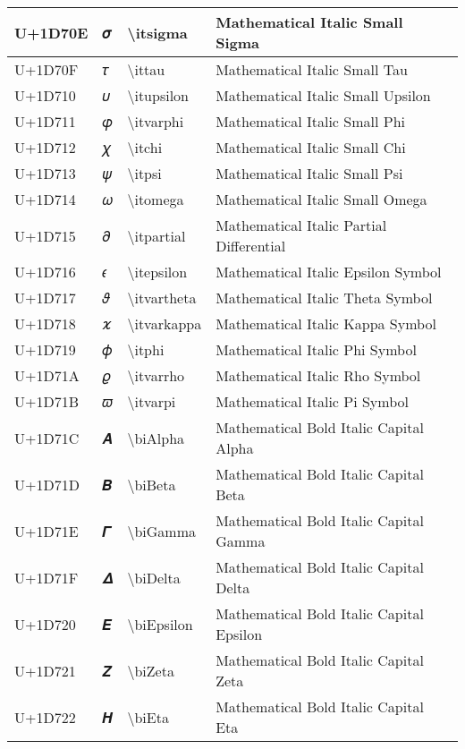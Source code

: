\begin{table}[h]
\begin{tabulary}{\linewidth}{|L|L|L|L|}
\hline
U+1D70E & 𝜎 & {\textbackslash}itsigma & Mathematical Italic Small Sigma \\
\hline
U+1D70F & 𝜏 & {\textbackslash}ittau & Mathematical Italic Small Tau \\
\hline
U+1D710 & 𝜐 & {\textbackslash}itupsilon & Mathematical Italic Small Upsilon \\
\hline
U+1D711 & 𝜑 & {\textbackslash}itvarphi & Mathematical Italic Small Phi \\
\hline
U+1D712 & 𝜒 & {\textbackslash}itchi & Mathematical Italic Small Chi \\
\hline
U+1D713 & 𝜓 & {\textbackslash}itpsi & Mathematical Italic Small Psi \\
\hline
U+1D714 & 𝜔 & {\textbackslash}itomega & Mathematical Italic Small Omega \\
\hline
U+1D715 & 𝜕 & {\textbackslash}itpartial & Mathematical Italic Partial Differential \\
\hline
U+1D716 & 𝜖 & {\textbackslash}itepsilon & Mathematical Italic Epsilon Symbol \\
\hline
U+1D717 & 𝜗 & {\textbackslash}itvartheta & Mathematical Italic Theta Symbol \\
\hline
U+1D718 & 𝜘 & {\textbackslash}itvarkappa & Mathematical Italic Kappa Symbol \\
\hline
U+1D719 & 𝜙 & {\textbackslash}itphi & Mathematical Italic Phi Symbol \\
\hline
U+1D71A & 𝜚 & {\textbackslash}itvarrho & Mathematical Italic Rho Symbol \\
\hline
U+1D71B & 𝜛 & {\textbackslash}itvarpi & Mathematical Italic Pi Symbol \\
\hline
U+1D71C & 𝜜 & {\textbackslash}biAlpha & Mathematical Bold Italic Capital Alpha \\
\hline
U+1D71D & 𝜝 & {\textbackslash}biBeta & Mathematical Bold Italic Capital Beta \\
\hline
U+1D71E & 𝜞 & {\textbackslash}biGamma & Mathematical Bold Italic Capital Gamma \\
\hline
U+1D71F & 𝜟 & {\textbackslash}biDelta & Mathematical Bold Italic Capital Delta \\
\hline
U+1D720 & 𝜠 & {\textbackslash}biEpsilon & Mathematical Bold Italic Capital Epsilon \\
\hline
U+1D721 & 𝜡 & {\textbackslash}biZeta & Mathematical Bold Italic Capital Zeta \\
\hline
U+1D722 & 𝜢 & {\textbackslash}biEta & Mathematical Bold Italic Capital Eta \\

\end{tabulary}
\end{table}
